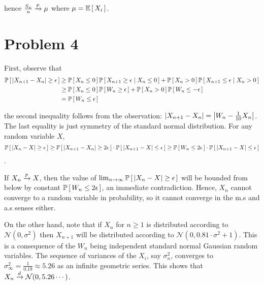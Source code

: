 \documentclass[12pt]{article}%
\begin{document}
hence $\frac{S_n}{n} \xrightarrow[]{p} \mu$ where $\mu = \mathbb{E}\left[\,X_i\,\right]$.

\section{Problem 4}

First, observe that
\begin{align*}
  \mathbb{P}\left[\,\abs{X_{n+1} - X_n} \geq \epsilon\,\right] & \geq \mathbb{P}\left[\,X_{n} \leq 0\,\right]\mathbb{P}\left[\,X_{n+1} \geq \epsilon \mid X_{n} \leq 0\,\right] + \mathbb{P}\left[\,X_n > 0\,\right]\mathbb{P}\left[\,X_{n+1} \leq \epsilon \mid X_n > 0\,\right] \\
  & \geq \mathbb{P}\left[\,X_{n} \leq 0\,\right]\mathbb{P}\left[\,W_n \geq \epsilon\,\right] + \mathbb{P}\left[\,X_n > 0\,\right]\mathbb{P}\left[\,W_{n} \leq -\epsilon\,\right] \\
  & = \mathbb{P}\left[\,W_n \leq \epsilon\,\right]
\end{align*}

 the second inequality follows from the observation: $\abs{X_{n+1} - X_n} = \abs{W_n - \frac{1}{10}X_n}$. The last equality is just symmetry of the standard normal distribution. For any random variable $X$,
%
 $$\mathbb{P}\left[\,\abs{X_n - X} \geq \epsilon\,\right] \geq \mathbb{P}\left[\,\abs{X_{n+1} - X_n} \geq 2\epsilon\,\right]\cdot \mathbb{P}\left[\,\abs{X_{n+1} - X} \leq \epsilon\,\right] \geq \mathbb{P}\left[\,W_n \leq 2\epsilon\,\right] \cdot \mathbb{P}\left[\,\abs{X_{n+1} - X} \leq \epsilon\,\right]$$.


%
If $X_n \xrightarrow[]{p} X$, then the value of $ \lim_{n \rightarrow \infty}\mathbb{P}\left[\,\abs{X_n - X} \geq \epsilon\,\right]$ will be bounded from below by constant $\mathbb{P}\left[\,W_n \leq 2\epsilon\,\right]$, an immediate contradiction. Hence, $X_n$ cannot converge to a random variable in probability, so it cannot converge in the m.s and a.s senses either. \newline

On the other hand, note that if $X_n$ for $n \geq 1$ is distributed according to $\mathcal{N}(0,\sigma^2)$ then $X_{n+1}$ will be distributed according to $\mathcal{N}(0,0.81\cdot\sigma^2 + 1)$. This is a consequence of the $W_n$ being independent standard normal Gaussian random variables.  The sequence of variances of the $X_i$, say $\sigma^2_n$, converges to $\sigma_\infty^2 = \frac{1}{0.19} \approx 5.26$ as an infinite geometric series. This shows that $X_n \xrightarrow[]{d} \mathcal{N}(0, 5.26\cdots)$.
\end{document}
